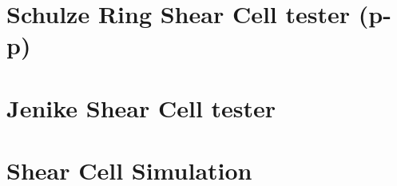 \lipsum[1]

% 
% 
% 

\section{Schulze Ring Shear Cell tester (p-p)}
\label{sec:SRSCT}

\lipsum[1]

\section{Jenike Shear Cell tester}
\label{sec:jsct}

\lipsum[1]

% 
% 
% 

\lipsum[3]

\section{Shear Cell Simulation}
\label{sec:scsimulation}

